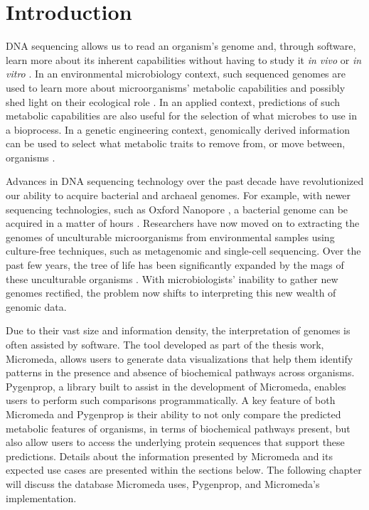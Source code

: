 \chapter{Introduction} \label{introduction}

DNA sequencing allows us to read an organism's genome and, through software, learn more about its inherent capabilities without having to study it \textit{in vivo} or \textit{in vitro} \cite{de2012bioinformatic}. In an environmental microbiology context, such sequenced genomes are used to learn more about microorganisms' metabolic capabilities and possibly shed light on their ecological role \cite{de2012bioinformatic}. In an applied context, predictions of such metabolic capabilities are also useful for the selection of what microbes to use in a bioprocess. In a genetic engineering context, genomically derived information can be used to select what metabolic traits to remove from, or move between, organisms \cite{strohl2001biochemical,sanchez2005novel}.

Advances in DNA sequencing technology over the past decade have revolutionized our ability to acquire bacterial and archaeal genomes. For example, with newer sequencing technologies, such as Oxford Nanopore \cite{jain2016oxford}, a bacterial genome can be acquired in a matter of hours \cite{Lu2016,Cao2017}. Researchers have now moved on to extracting the genomes of unculturable microorganisms from environmental samples using culture-free techniques, such as metagenomic \cite{quince2017shotgun} and single-cell \cite{gawad2016single} sequencing. Over the past few years, the tree of life has been significantly expanded by the \gls{mags} \cite{bowers2017minimum} of these unculturable organisms \cite{Hug2016,Parks2017}. With microbiologists' inability to gather new genomes rectified, the problem now shifts to interpreting this new wealth of genomic data.

Due to their vast size and information density, the interpretation of genomes is often assisted by software. The tool developed as part of the thesis work, Micromeda, allows users to generate data visualizations that help them identify patterns in the presence and absence of biochemical pathways across organisms. Pygenprop, a library built to assist in the development of Micromeda, enables users to perform such comparisons programmatically. A key feature of both Micromeda and Pygenprop is their ability to not only compare the predicted metabolic features of organisms, in terms of biochemical pathways present, but also allow users to access the underlying protein sequences that support these predictions. Details about the information presented by Micromeda and its expected use cases are presented within the sections below. The following chapter will discuss the database Micromeda uses, Pygenprop, and Micromeda's implementation.

